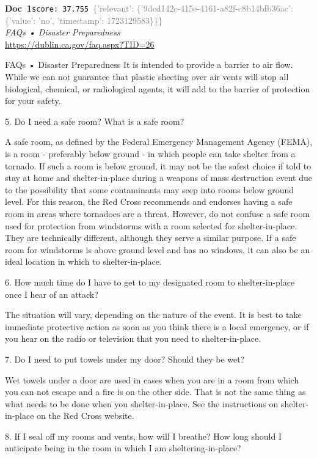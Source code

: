\documentclass[a4paper,11pt]{article}
\begin{document}
\begin{docenv}
{\footnotesize\textcolor{doccolor}{\textbf{Doc~1}}}\hfill{\tiny\texttt{score:~37.755}}\ {\tiny\textcolor{gray}{\{'relevant': \{'9dcd142c-415e-4161-a82f-c8b14bfb36ac': \{'value': 'no', 'timestamp': 1723129583\}\}\}}}\\[3pt]
{\small\textit{FAQs • Disaster Preparedness}}\\[2pt]
{\tiny\url{https://dublin.ca.gov/faq.aspx?TID=26}}\\[4pt]
{\footnotesize FAQs • Disaster Preparedness
It is intended to provide a barrier to air flow. While we can not guarantee that plastic sheeting over air vents will stop all biological, chemical, or radiological agents, it will add to the barrier of protection for your safety.	

5.
Do I need a safe room? What is a safe room?

A safe room, as defined by the Federal Emergency Management Agency (FEMA), is a room - preferably below ground - in which people can take shelter from a tornado. If such a room is below ground, it may not be the safest choice if told to stay at home and shelter-in-place during a weapons of mass destruction event due to the possibility that some contaminants may seep into rooms below ground level. For this reason, the Red Cross recommends and endorses having a safe room in areas where tornadoes are a threat. However, do not confuse a safe room used for protection from windstorms with a room selected for shelter-in-place. They are technically different, although they serve a similar purpose. If a safe room for windstorms is above ground level and has no windows, it can also be an ideal location in which to shelter-in-place.	

6.
How much time do I have to get to my designated room to shelter-in-place once I hear of an attack?

The situation will vary, depending on the nature of the event. It is best to take immediate protective action as soon as you think there is a local emergency, or if you hear on the radio or television that you need to shelter-in-place.	

7.
Do I need to put towels under my door? Should they be wet?

Wet towels under a door are used in cases when you are in a room from which you can not escape and a fire is on the other side. That is not the same thing as what needs to be done when you shelter-in-place. See the instructions on shelter-in-place on the Red Cross website.	

8.
If I seal off my rooms and vents, how will I breathe? How long should I anticipate being in the room in which I am sheltering-in-place?}
\end{docenv}
\end{document}
